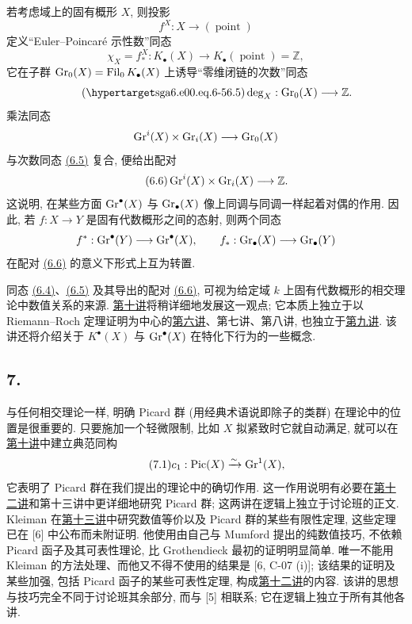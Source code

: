 若考虑域上的固有概形 $X$, 则投影
\[
f^X:X\longrightarrow (\operatorname{point})
\]
定义“Euler--Poincaré 示性数”同态
\begin{equation}\tag{6.4}
\chi_X=f_*^X:K_\bullet(X)\longrightarrow K_\bullet(\operatorname{point})=\mathbb Z,
\end{equation}
它在子群 $\operatorname{Gr}_0(X)=\operatorname{Fil}_0K_\bullet(X)$ 上诱导“零维闭链的次数”同态
\begin{equation}\tag{\sgaStableTargetInline{sga6.e00.eq.6-5}6.5}
\deg_X:\Gr_0(X)\longrightarrow \mathbb Z.
\end{equation}
乘法同态
\[
\operatorname{Gr}^i(X)\times \operatorname{Gr}_i(X)\longrightarrow \operatorname{Gr}_0(X)
\]
与次数同态 \hyperlink{sga6.e00.eq.6-5}{(6.5)} 复合, 便给出配对
\begin{equation}\tag{6.6}
\operatorname{Gr}^i(X)\times \operatorname{Gr}_i(X)\longrightarrow \mathbb Z.
\end{equation}
这说明, 在某些方面 $\operatorname{Gr}^\bullet(X)$ 与 $\operatorname{Gr}_\bullet(X)$ 像上同调与同调一样起着对偶的作用. 因此, 若 $f:X\to Y$ 是固有代数概形之间的态射, 则两个同态
\[
f^*:\operatorname{Gr}^\bullet(Y)\longrightarrow \operatorname{Gr}^\bullet(X),\qquad f_*:\operatorname{Gr}_\bullet(X)\longrightarrow \operatorname{Gr}_\bullet(Y)
\]
在配对 \hyperlink{sga6.e00.eq.6-6}{(6.6)} 的意义下形式上互为转置.

同态 \hyperlink{sga6.e00.eq.6-4}{(6.4)}、\hyperlink{sga6.e00.eq.6-5}{(6.5)} 及其导出的配对 \hyperlink{sga6.e00.eq.6-6}{(6.6)}, 可视为给定域 $k$ 上固有代数概形的相交理论中数值关系的来源. \hyperlink{sga6.e10.expose}{第十讲}将稍详细地发展这一观点; 它本质上独立于以 Riemann--Roch 定理证明为中心的\hyperlink{sga6.e06.expose}{第六讲}、第七讲、第八讲, 也独立于\hyperlink{sga6.e09.expose}{第九讲}. 该讲还将介绍关于 $K^\bullet(X)$ 与 $\operatorname{Gr}^\bullet(X)$ 在特化下行为的一些概念.

\subsection*{7.}
与任何相交理论一样, 明确 Picard 群 (用经典术语说即除子的类群) 在理论中的位置是很重要的. 只要施加一个轻微限制, 比如 $X$ 拟紧致时它就自动满足, 就可以在\hyperlink{sga6.e10.expose}{第十讲}中建立典范同构
\begin{equation}\tag{7.1}
c_1:\operatorname{Pic}(X)\xrightarrow{\sim}\operatorname{Gr}^1(X),
\end{equation}
它表明了 Picard 群在我们提出的理论中的确切作用. 这一作用说明有必要在\hyperlink{sga6.e12.expose}{第十二讲}和第十三讲中更详细地研究 Picard 群; 这两讲在逻辑上独立于讨论班的正文. Kleiman 在\hyperlink{sga6.e13.expose}{第十三讲}中研究数值等价以及 Picard 群的某些有限性定理, 这些定理已在 [6] 中公布而未附证明. 他使用由自己与 Mumford 提出的纯数值技巧, 不依赖 Picard 函子及其可表性理论, 比 Grothendieck 最初的证明明显简单. 唯一不能用 Kleiman 的方法处理、而他又不得不使用的结果是 [6, C-07 (i)]; 该结果的证明及某些加强, 包括 Picard 函子的某些可表性定理, 构成\hyperlink{sga6.e12.expose}{第十二讲}的内容. 该讲的思想与技巧完全不同于讨论班其余部分, 而与 [5] 相联系; 它在逻辑上独立于所有其他各讲.

